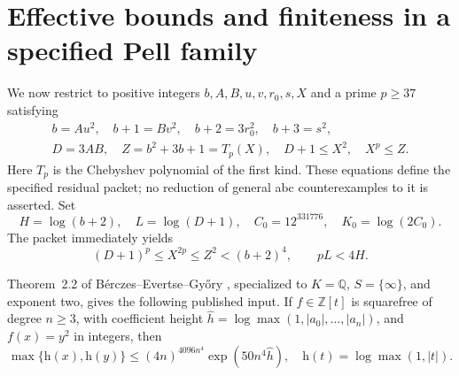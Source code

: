\documentclass[11pt]{amsart}
\theoremstyle{definition}
\theoremstyle{remark}
\newcommand{\Q}{\mathbb Q}
\newcommand{\Z}{\mathbb Z}
\newcommand{\height}{\mathrm h}
\begin{document}


\section{Effective bounds and finiteness in a specified Pell family}\label{sec:pell}

We now restrict to positive integers $b,A,B,u,v,r_0,s,X$ and a prime
$p\ge37$ satisfying
\begin{align}
 b=Au^2,\quad b+1=Bv^2,\quad b+2=3r_0^2,\quad b+3=s^2,\label{eq:packet1}\\
 D=3AB,\quad Z=b^2+3b+1=T_p(X),\quad
 D+1\le X^2,\quad X^p\le Z.\label{eq:packet2}
\end{align}
Here $T_p$ is the Chebyshev polynomial of the first kind. These equations
define the specified residual packet; no reduction of general abc
counterexamples to it is asserted.
Set
\[
 H=\log(b+2),\quad L=\log(D+1),\quad
 C_0=12^{331776},\quad K_0=\log(2C_0).
\]
The packet immediately yields
\begin{equation}\label{eq:packetgate}
 (D+1)^p\le X^{2p}\le Z^2<(b+2)^4,\qquad pL<4H.
\end{equation}

Theorem~2.2 of B\'erczes--Evertse--Gy\H{o}ry \cite{BEG}, specialized to
$K=\Q$, $S=\{\infty\}$, and exponent two, gives the following published
input. If $f\in\Z[t]$ is squarefree of degree $n\ge3$, with coefficient
height $\widehat h=\log\max(1,|a_0|,\ldots,|a_n|)$, and $f(x)=y^2$
in integers, then
\begin{equation}\label{eq:beg}
 \max\{\height(x),\height(y)\}
 \le (4n)^{4096n^4}\exp(50n^4\widehat h),
 \quad \height(t)=\log\max(1,|t|).
\end{equation}
\end{document}
